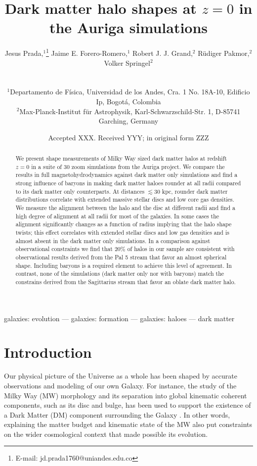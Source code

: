 \documentclass[usenatbib]{mnras}
\title[Dark matter halo shapes at $z=0$] {Dark matter halo shapes at
  $z=0$ in the Auriga simulations}
\author[Prada et al.]{
\parbox[t]{\textwidth}{
{Jesus Prada,$^{1}$\thanks{E-mail: jd.prada1760@uniandes.edu.co}}
{Jaime E. Forero-Romero,$^{1}$}
{Robert J. J. Grand,$^{2}$}
{R\"udiger Pakmor,$^{2}$}
{Volker Springel$^{2}$}
}
\\\\
$^{1}$Departamento de F\'isica, Universidad de los Andes, Cra. 1 No.
18A-10, Edificio Ip, Bogot\'a, Colombia\\
$^{2}$Max-Planck-Institut f\"ur Astrophysik, Karl-Schwarzschild-Str. 1, D-85741 Garching, Germany\\
}
\date{Accepted XXX. Received YYY; in original form ZZZ}
\begin{document}
\label{firstpage}
\pagerange{\pageref{firstpage}--\pageref{lastpage}}
\maketitle

\begin{abstract}
We present shape measurements of Milky Way sized dark matter halos at
redshift $z=0$ in a suite of 30 zoom simulations from the Auriga
project. 
We compare the results in full magnetohydrodynamics against dark
matter only simulations and find a strong influence of baryons 
in making dark matter haloes rounder at all radii compared to its dark 
matter only counterparts.
At distances $\lesssim 30$ kpc, rounder dark matter distributions
correlate with extended massive stellar discs and low core gas 
densities.  
We measure the alignment between the halo and the disc at
different radii and find a high degree of alignment at all radii for most 
of the galaxies.
In some cases the alignment significantly changes as a function of
radius implying that the halo shape twists; 
this effect correlates with extended stellar discs and
low gas densities and is almost absent in the dark matter only
simulations.  
In a comparison against observational constraints we find that $20\%$
of halos in our sample are consistent with observational results derived
from the Pal 5 stream that favor an almost spherical shape.
Including baryons is a required element to achieve this
level of agreement. In contrast, none of the simulations (dark matter
only nor with baryons) match the constrains derived from the
Sagittarius stream that favor an oblate dark matter halo.
\end{abstract}

\begin{keywords}
galaxies: evolution --- galaxies: formation --- galaxies: haloes ---
dark matter
\end{keywords}



\section{Introduction}

Our physical picture of the Universe as a whole has been shaped by
accurate observations and modeling of our own Galaxy. 
For instance, the study of the Milky Way (MW) morphology and its
separation into global kinematic coherent components, such as its
disc and bulge, has been used to support the existence of a Dark Matter (DM) component surrounding the Galaxy
\citep{2000MNRAS.311..361O,2009PASJ...61..227S,2010JCAP...08..004C,2013ApJ...779..115B,Iocco15}. 
In other words, explaining the matter budget and kinematic state of the MW also put constraints on the wider cosmological context that made possible its evolution.
\end{document}

